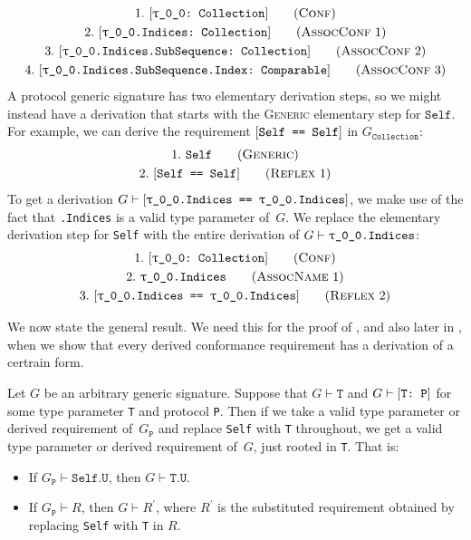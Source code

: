 \documentclass[../generics]{subfiles}
\begin{document}
\begin{gather*}
\ConfStep{\rT}{Collection}{1}\\
\AssocConfStep{1}{\rT.Indices}{Collection}{2}\\
\AssocConfStep{2}{\rT.Indices.SubSequence}{Collection}{3}\\
\AssocConfStep{3}{\rT.Indices.SubSequence.Index}{Comparable}{4}
\end{gather*}
A protocol generic signature has two elementary derivation steps, so we might instead have a derivation that starts with the \textsc{Generic} elementary step for $\texttt{Self}$. For example, we can derive the requirement $[\texttt{Self == Self}]$ in $G_\texttt{Collection}$:
\begin{gather*}
\GenericStep{Self}{1}\\
\ReflexStep{1}{Self}{2}
\end{gather*}
To get a derivation $G \vdash [\texttt{\texttt{$\uptau$\_0\_0}.Indices == \texttt{$\uptau$\_0\_0}.Indices}]$, we make use of the fact that \texttt{\rT.Indices} is a valid type parameter of~$G$. We replace the elementary derivation step for \texttt{Self} with the entire derivation of $G \vdash \texttt{\texttt{$\uptau$\_0\_0}.Indices}$:
\begin{gather*}
\ConfStep{\rT}{Collection}{1}\\
\AssocNameStep{1}{\rT.Indices}{2}\\
\ReflexStep{2}{\rT.Indices}{3}
\end{gather*}

We now state the general result. We need this for the proof of , and also later in , when we show that every derived conformance requirement has a derivation of a certrain form.

\begin{lemma}\label{subst lemma}
Let $G$ be an arbitrary generic signature. Suppose that $G\vdash\texttt{T}$ and $G\vdash[\texttt{T:~P}]$ for some type parameter \texttt{T} and protocol \texttt{P}. Then if we take a valid type parameter or derived requirement of~$G_\texttt{P}$ and replace \texttt{Self} with \texttt{T} throughout, we get a valid type parameter or derived requirement of~$G$, just rooted in \texttt{T}. That is:
\begin{itemize}
\item If $G_\texttt{P}\vdash\texttt{Self.U}$, then $G\vdash\texttt{T.U}$.
\item If $G_\texttt{P}\vdash R$, then $G\vdash R^\prime$, where $R^\prime$ is the substituted requirement obtained by replacing \texttt{Self} with \texttt{T} in $R$.
\end{itemize}
\end{lemma}
\end{document}
